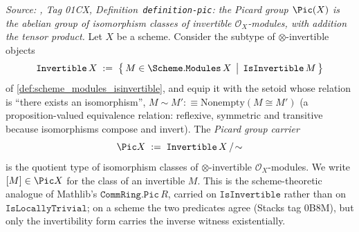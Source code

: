 \begin{definition}\leanok
  \label{def:pic_carrier}
  \textit{Source: \cite{stacks-project}, Tag 01CX, Definition~\texttt{definition-pic}:
  the Picard group \(\Pic(X)\) is the abelian group of isomorphism classes of
  invertible \(\mathcal{O}_X\)-modules, with addition the tensor product.}
  Let \(X\) be a scheme. Consider the subtype of \(\otimes\)-invertible objects
  \[
    \mathtt{Invertible}\,X
    \;:=\;
    \bigl\{\, M \in \Scheme.\mathtt{Modules}\,X
              \,\bigm|\, \mathtt{IsInvertible}\,M \,\bigr\}
  \]
  of \cref{def:scheme_modules_isinvertible}, and equip it with the setoid whose
  relation is ``there exists an isomorphism'',
  \(M \sim M' :\equiv \mathrm{Nonempty}(M \cong M')\) (a proposition-valued
  equivalence relation: reflexive, symmetric and transitive because isomorphisms
  compose and invert). The \emph{Picard group carrier}
  \[
    \Pic X \;:=\; \mathtt{Invertible}\,X \,/\!\sim
  \]
  is the quotient type of isomorphism classes of \(\otimes\)-invertible
  \(\mathcal{O}_X\)-modules. We write \([M] \in \Pic X\) for the class of an
  invertible \(M\). This is the scheme-theoretic analogue of Mathlib's
  \(\mathtt{CommRing.Pic}\,R\), carried on \(\mathtt{IsInvertible}\) rather than on
  \(\mathtt{IsLocallyTrivial}\); on a scheme the two predicates agree (Stacks tag
  0B8M), but only the invertibility form carries the inverse witness existentially.
\end{definition}

